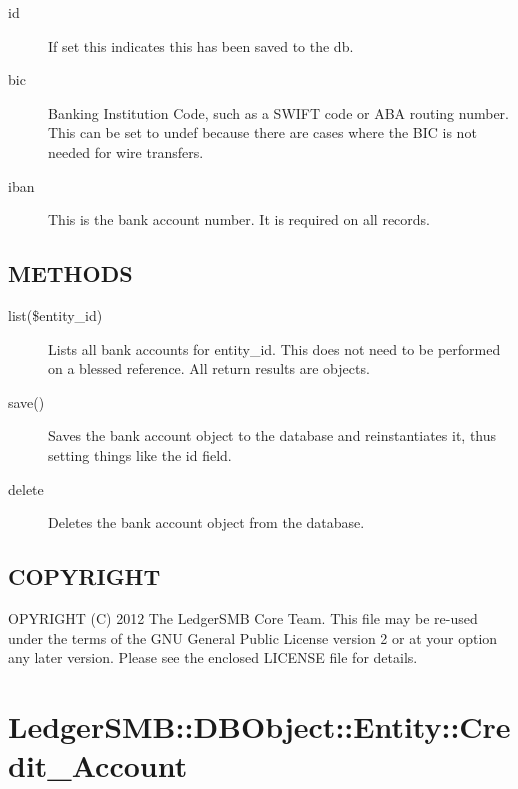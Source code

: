 \begin{description}
\begin{description}
\begin{description}
\begin{description}
\begin{description}
\begin{description}
\begin{description}
\begin{description}
\begin{description}
\item[{id}] \mbox{}

If set this indicates this has been saved to the db.


\item[{bic}] \mbox{}

Banking Institution Code, such as a SWIFT code or ABA routing number.  This can
be set to undef because there are cases where the BIC is not needed for wire
transfers.


\item[{iban}] \mbox{}

This is the bank account number.  It is required on all records.

\end{description}
\subsection*{METHODS\label{LedgerSMB::DBObject::Entity::Bank_METHODS}}
\begin{description}

\item[{list(\$entity\_id)}] \mbox{}

Lists all bank accounts for entity\_id.  This does not need to be performed on a
blessed reference.  All return results are objects.


\item[{save()}] \mbox{}

Saves the bank account object to the database and reinstantiates it, thus
setting things like the id field.


\item[{delete}] \mbox{}

Deletes the bank account object from the database.

\end{description}
\subsection*{COPYRIGHT\label{LedgerSMB::DBObject::Entity::Bank_COPYRIGHT}}


OPYRIGHT (C) 2012 The LedgerSMB Core Team.  This file may be re-used under the
terms of the GNU General Public License version 2 or at your option any later
version.  Please see the enclosed LICENSE file for details.

\section{LedgerSMB::DBObject::Entity::Credit\_Account\label{LedgerSMB::DBObject::Entity::Credit_Account}}



\end{description}
\end{description}
\end{description}
\end{description}
\end{description}
\end{description}
\end{description}
\end{description}
